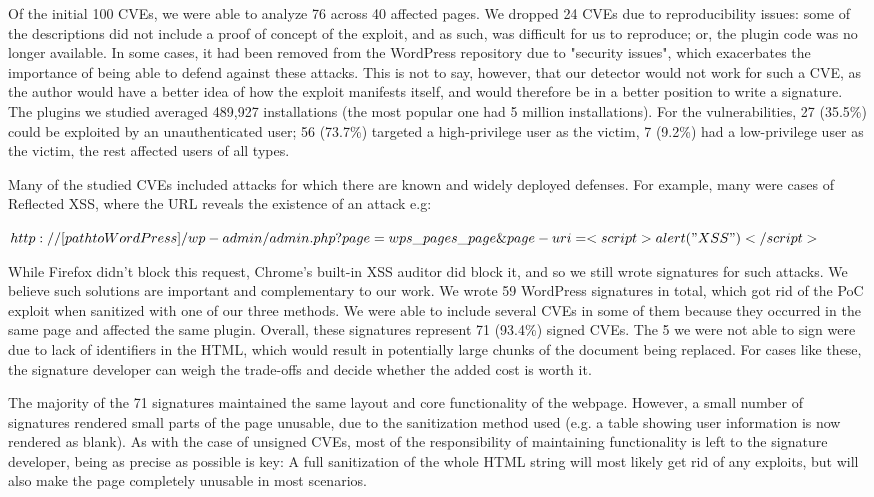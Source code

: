 Of the initial 100 CVEs, we were able to analyze 76 across 40 affected pages. We dropped 24 CVEs due to reproducibility issues: some of the descriptions did not include a proof of concept of the exploit, and as such, was difficult for us to reproduce; or, the plugin code was no longer available. In some cases, it had been removed from the WordPress repository due to "security issues", which exacerbates the importance of being able to defend against these attacks. This is not to say, however, that our detector would not work for such a CVE, as the author would have a better idea of how the exploit manifests itself, and would therefore be in a better position to write a signature. The plugins we studied averaged 489,927 installations (the most popular one had 5 million installations). For the vulnerabilities, 27 (35.5\%) could be exploited by an unauthenticated user; 56 (73.7\%) targeted a high-privilege user as the victim, 7 (9.2\%) had a low-privilege user as the victim, the rest affected users of all types.

Many of the studied CVEs included attacks for which there are known and widely deployed defenses. For example, many were cases of Reflected XSS, where the URL reveals the existence of an attack e.g:


$http://[path to WordPress]/wp-admin/admin.php?page=wps\_pages\_page\&page-uri=<script>alert("XSS")</script>$

While Firefox didn't block this request, Chrome's built-in XSS auditor did block it, and so we still wrote signatures for such attacks. We believe such solutions are important and complementary to our work. We wrote 59 WordPress signatures in total, which got rid of the PoC exploit when sanitized with one of our three methods. We were able to include several CVEs in some of them because they occurred in the same page and affected the same plugin. Overall, these signatures represent 71 (93.4\%) signed CVEs. The 5 we were not able to sign were due to lack of identifiers in the HTML, which would result in potentially large chunks of the document being replaced. For cases like these, the signature developer can weigh the trade-offs and decide whether the added cost is worth it.

The majority of the 71 signatures maintained the same layout and core functionality of the webpage. However, a small number of signatures rendered small parts of the page unusable, due to the sanitization method used (e.g. a table showing user information is now rendered as blank). As with the case of unsigned CVEs, most of the responsibility of maintaining functionality is left to the signature developer, being as precise as possible is key: A full sanitization of the whole HTML string will most likely get rid of any exploits, but will also make the page completely unusable in most scenarios.

